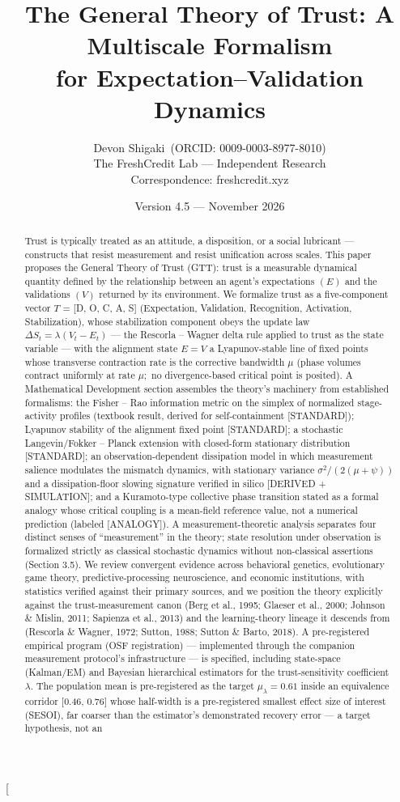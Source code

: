 \documentclass[11pt,twocolumn]{article}
\title{The General Theory of Trust: A Multiscale Formalism\\ for Expectation--Validation Dynamics}
\author{Devon Shigaki~(ORCID: 0009-0003-8977-8010)\\
\small The FreshCredit Lab --- Independent Research\\
\small Correspondence: freshcredit.xyz}
\date{\small Version 4.5 --- November 2026}
\theoremstyle{gttdef}
\theoremstyle{gttplain}
\begin{document}
\twocolumn[{\begin{@twocolumnfalse}
\maketitle
\begin{abstract}
Trust is typically treated as an attitude, a disposition, or a social lubricant --- constructs that resist measurement and resist unification across scales. This paper proposes the General Theory of Trust (GTT): trust is a measurable dynamical quantity defined by the relationship between an agent's expectations $(E)$ and the validations $(V)$ returned by its environment. We formalize trust as a five-component vector $T$ = [D, O, C, A, S] (Expectation, Validation, Recognition, Activation, Stabilization), whose stabilization component obeys the update law $\Delta S_t = \lambda(V_t - E_t)$ --- the Rescorla -- Wagner delta rule applied to trust as the state variable --- with the alignment state $E = V$ a Lyapunov-stable line of fixed points whose transverse contraction rate is the corrective bandwidth $\mu$ (phase volumes contract uniformly at rate $\mu;$ no divergence-based critical point is posited). A Mathematical Development section assembles the theory's machinery from established formalisms: the Fisher -- Rao information metric on the simplex of normalized stage-activity profiles (textbook result, derived for self-containment [STANDARD]); Lyapunov stability of the alignment fixed point [STANDARD]; a stochastic Langevin/Fokker -- Planck extension with closed-form stationary distribution [STANDARD]; an observation-dependent dissipation model in which measurement salience modulates the mismatch dynamics, with stationary variance $\sigma^{2}/(2(\mu+\psi))$ and a dissipation-floor slowing signature verified in silico [DERIVED + SIMULATION]; and a Kuramoto-type collective phase transition stated as a formal analogy whose critical coupling is a mean-field reference value, not a numerical prediction (labeled [ANALOGY]). A measurement-theoretic analysis separates four distinct senses of ``measurement'' in the theory; state resolution under observation is formalized strictly as classical stochastic dynamics without non-classical assertions (Section 3.5). We review convergent evidence across behavioral genetics, evolutionary game theory, predictive-processing neuroscience, and economic institutions, with statistics verified against their primary sources, and we position the theory explicitly against the trust-measurement canon (Berg et al., 1995; Glaeser et al., 2000; Johnson \& Mislin, 2011; Sapienza et al., 2013) and the learning-theory lineage it descends from (Rescorla \& Wagner, 1972; Sutton, 1988; Sutton \& Barto, 2018). A pre-registered empirical program (OSF registration) --- implemented through the companion measurement protocol's infrastructure --- is specified, including state-space (Kalman/EM) and Bayesian hierarchical estimators for the trust-sensitivity coefficient $\lambda.$ The population mean is pre-registered as the target $\mu_\lambda = 0.61$ inside an equivalence corridor [0.46, 0.76] whose half-width is a pre-registered smallest effect size of interest (SESOI), far coarser than the estimator's demonstrated recovery error --- a target hypothesis, not an 
\end{abstract}
\end{@twocolumnfalse}}
\end{document}
